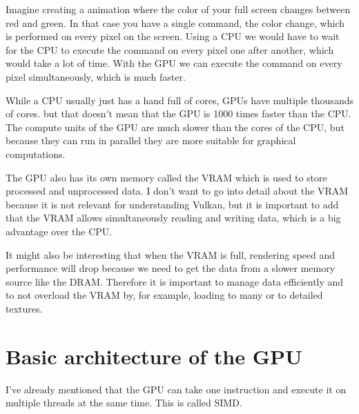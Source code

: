 \documentclass[12pt]{report} \usepackage{preamble}
\begin{document}
Imagine creating a animation where the color of your full screen changes
between red and green. In that case you have a single command, the color
change, which is performed on every pixel on the screen. Using a \ac{CPU}
we would have to wait for the \ac{CPU} to execute the command on every pixel
one after another, which would take a lot of time. With the \ac{GPU} we can
execute the command on every pixel simultaneously, which is much faster.

While a \ac{CPU} usually just has a hand full of cores, \ac{GPU}s have multiple
thousands of cores. \cite{NVIDIA-rtx-4090}
but that doesn't mean that the \ac{GPU} is 1000
times faster than the \ac{CPU}. The compute units of the \ac{GPU} are much slower
than the cores of the \ac{CPU}, but because they can run in parallel they are
more suitable for graphical computations. \cite{CUDA_Programming_Guide}

The \ac{GPU} also has its own memory called the \ac{VRAM}
which is used to store processed and unprocessed data.
I don't want to go into detail about the \ac{VRAM} because it is not relevant
for understanding Vulkan, but it is important to add that the \ac{VRAM}
allows simultaneously reading and writing data, which is a big advantage
over the \ac{CPU}. \cite{vram}

It might also be interesting that when the \ac{VRAM} is full, rendering
speed and performance will drop because we need to get the data from a
slower memory source like the DRAM.  Therefore it is important to manage
data efficiently and to not overload the \ac{VRAM} by, for example, loading
to many or to detailed textures.

\section{Basic architecture of the GPU}

I've already mentioned that the \ac{GPU} can take one instruction and
execute it on multiple threads at the same time. This is called \ac{SIMD}.
\cite{cherry_gpu_architecture}
\end{document}
